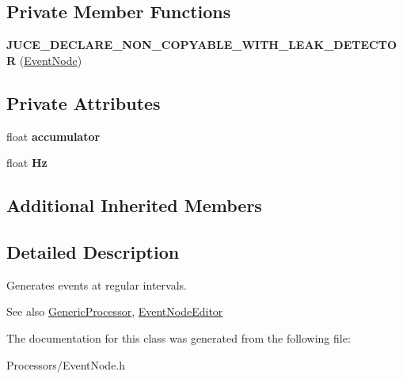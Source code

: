 \subsection*{Private Member Functions}
\begin{DoxyCompactItemize}
\item 
\hypertarget{classEventNode_aab376837282cb88b5fd8078ef05e0588}{{\bfseries J\-U\-C\-E\-\_\-\-D\-E\-C\-L\-A\-R\-E\-\_\-\-N\-O\-N\-\_\-\-C\-O\-P\-Y\-A\-B\-L\-E\-\_\-\-W\-I\-T\-H\-\_\-\-L\-E\-A\-K\-\_\-\-D\-E\-T\-E\-C\-T\-O\-R} (\hyperlink{classEventNode}{Event\-Node})}\label{classEventNode_aab376837282cb88b5fd8078ef05e0588}

\end{DoxyCompactItemize}
\subsection*{Private Attributes}
\begin{DoxyCompactItemize}
\item 
\hypertarget{classEventNode_a43dedc33c1fb9d1376c3dff836893194}{float {\bfseries accumulator}}\label{classEventNode_a43dedc33c1fb9d1376c3dff836893194}

\item 
\hypertarget{classEventNode_a992d2481092bf59a56e9544257576abc}{float {\bfseries Hz}}\label{classEventNode_a992d2481092bf59a56e9544257576abc}

\end{DoxyCompactItemize}
\subsection*{Additional Inherited Members}


\subsection{Detailed Description}
Generates events at regular intervals.

\begin{DoxySeeAlso}{See also}
\hyperlink{classGenericProcessor}{Generic\-Processor}, \hyperlink{classEventNodeEditor}{Event\-Node\-Editor} 
\end{DoxySeeAlso}


The documentation for this class was generated from the following file\-:\begin{DoxyCompactItemize}
\item 
Processors/Event\-Node.\-h\end{DoxyCompactItemize}
